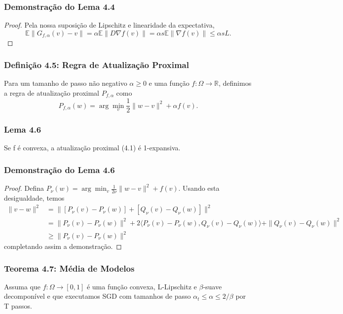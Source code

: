 \documentclass{beamer}
\newcommand{\EE}{\mathbb{E}}
\begin{document}
\begin{frame}
\frametitle{Demonstração do Lema 4.4}
\begin{proof}
Pela nossa suposição de Lipschitz e linearidade da expectativa,
$$ \EE\|G_{f,\alpha}(v) - v\| = \alpha\EE\|D\nabla f(v)\| = \alpha s\EE\|\nabla f(v)\| \le \alpha s L. $$ 
\end{proof}
\end{frame}

\begin{frame}
\frametitle{Definição 4.5: Regra de Atualização Proximal}
\begin{definition}
Para um tamanho de passo não negativo \(\alpha \ge 0\) e uma função \(f:\Omega \rightarrow \mathbb{R}\), definimos a regra de atualização proximal \(P_{f,\alpha}\) como
$$ P_{f,\alpha}(w) = \arg\min_{v} \frac{1}{2}\|w-v\|^2 + \alpha f(v). $$ 
\end{definition}
\end{frame}

\begin{frame}
\frametitle{Lema 4.6}
\begin{lemma}
Se f é convexa, a atualização proximal (4.1) é 1-expansiva. 
\end{lemma}
\end{frame}

\begin{frame}
\frametitle{Demonstração do Lema 4.6}
\begin{proof}
Defina \(P_{\nu}(w) = \arg\min_v \frac{1}{2\nu}\|w-v\|^2 + f(v)\).  Usando esta desigualdade, temos
\begin{align*}
\|v-w\|^2 &= \|[P_{\nu}(v)-P_{\nu}(w)] + [Q_{\nu}(v)-Q_{\nu}(w)]\|^2 \\
&= \|P_{\nu}(v)-P_{\nu}(w)\|^2 + 2\langle P_{\nu}(v)-P_{\nu}(w),Q_{\nu}(v)-Q_{\nu}(w)\rangle + \|Q_{\nu}(v)-Q_{\nu}(w)\|^2 \\
&\ge \|P_{\nu}(v)-P_{\nu}(w)\|^2
\end{align*}
completando assim a demonstração. 
\end{proof}
\end{frame}

\begin{frame}
\frametitle{Teorema 4.7: Média de Modelos}
\begin{theorem}
Assuma que \(f:\Omega \rightarrow [0,1]\) é uma função convexa, L-Lipschitz e \(\beta\)-suave decomponível e que executamos SGD com tamanhos de passo \(\alpha_t \le \alpha \le 2/\beta\) por T passos. 
\end{theorem}
\end{frame}
\end{document}
